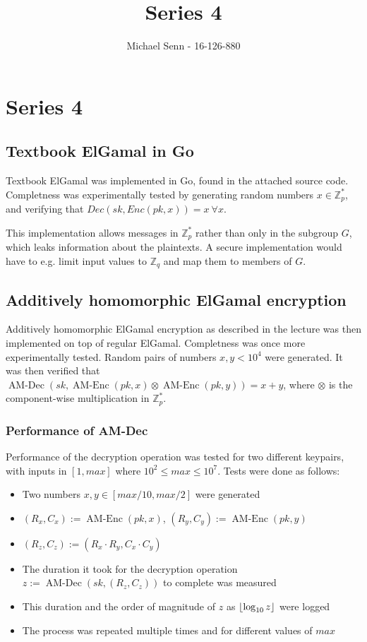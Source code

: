 \documentclass[a4paper]{scrreprt}
\title{Series 4}
\author{Michael Senn \maillink{michael.senn@students.unibe.ch} - 16-126-880}
\date{\printdate}
\DeclarePairedDelimiter\floor{\lfloor}{\rfloor}
\begin{document}
\maketitle


\setcounter{chapter}{3}

\chapter{Series 4}

\section{Textbook ElGamal in Go}

Textbook ElGamal was implemented in Go, found in the attached source code.
Completness was experimentally tested by generating random numbers $x \in
\mathbb{Z}^*_p$, and verifying that $Dec(sk, Enc(pk, x)) = x\ \forall x$.

This implementation allows messages in $\mathbb{Z}_p^*$ rather than only in the
subgroup $G$, which leaks information about the plaintexts. A secure
implementation would have to e.g. limit input values to $\mathbb{Z}_q$ and map
them to members of $G$.

\section{Additively homomorphic ElGamal encryption}

Additively homomorphic ElGamal encryption as described in the lecture was then
implemented on top of regular ElGamal. Completness was once more experimentally
tested. Random pairs of numbers $x, y < 10^4$ were generated.  It was then
verified that $\operatorname{AM-Dec}(sk, \operatorname{AM-Enc}(pk, x) \otimes
\operatorname{AM-Enc}(pk, y)) = x + y$, where $\otimes$ is the component-wise
multiplication  in $\mathbb{Z}_p^*$.

\subsection{Performance of AM-Dec}

Performance of the decryption operation was tested for two different keypairs,
with inputs in $[1, max]$ where $10^2 \leq max \leq 10^7$. Tests were done as
follows:

\begin{itemize}
		\item Two numbers $x, y \in [max / 10, max / 2]$ were generated
		\item $(R_x, C_x) := \operatorname{AM-Enc}(pk, x)$, $(R_y, C_y) :=
				\operatorname{AM-Enc}(pk, y)$
		\item $(R_z, C_z) := (R_x \cdot R_y, C_x \cdot C_y)$
		\item The duration it took for the decryption operation $z :=
				\operatorname{AM-Dec}(sk, (R_z, C_z))$ to complete was measured
		\item This duration and the order of magnitude of $z$ as
				$\floor{\log_{10}{z}}$ were logged
		\item The process was repeated multiple times and for different values
				of $max$
\end{itemize}
\end{document}
